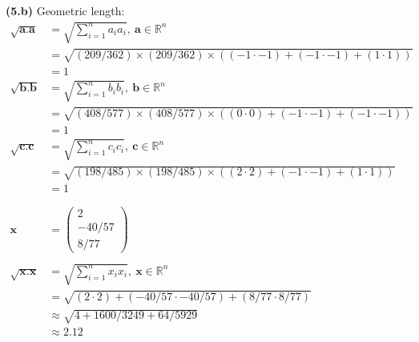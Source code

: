 \documentclass[12pt,letterpaper,fleqn]{article}
\theoremstyle{definition}
\begin{document}
\textbf{(5.b)} Geometric length:
\begin{equation*}
\begin{split}
\sqrt{\textbf{a.a}} &= \sqrt{\sum_{i=1}^{n} a_i a_i},~ \textbf{a} \in \mathbb{R}^n\\
 &= \sqrt{(209/362) \times (209/362) \times ((-1\cdot-1) + (-1\cdot-1) + (1\cdot1))}\\
&= 1\\
\sqrt{\textbf{b.b}} &= \sqrt{\sum_{i=1}^{n} b_i b_i},~ \textbf{b} \in \mathbb{R}^n\\
 &= \sqrt{(408/577) \times (408/577) \times ((0\cdot0) + (-1\cdot-1) + (-1\cdot-1))}\\
&= 1\\
\sqrt{\textbf{c.c}} &= \sqrt{\sum_{i=1}^{n} c_i c_i},~ \textbf{c} \in \mathbb{R}^n\\
 &= \sqrt{(198/485) \times (198/485) \times ((2\cdot2) + (-1\cdot-1) + (1\cdot1))}\\
&= 1\\
\\
\\
\textbf{x} &= \begin{pmatrix}
2\\
-40/57\\
8/77
\end{pmatrix}\\
\\
\sqrt{\textbf{x.x}} &= \sqrt{\sum_{i=1}^{n} x_i x_i},~ \textbf{x} \in \mathbb{R}^n\\
 &= \sqrt{(2\cdot2) + (-40/57 \cdot -40/57) + (8/77 \cdot 8/77)}\\
&\approx \sqrt{4 + 1600/3249 + 64/5929}\\
&\approx 2.12
\end{split}
\end{equation*}
\end{document}
